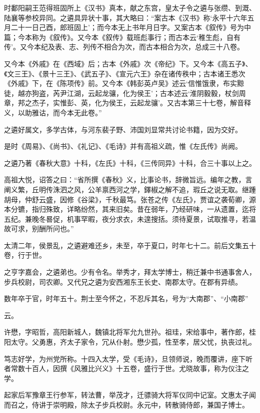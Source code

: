 \documentclass[12pt,UTF8]{ctexbook}
\begin{document}
时鄱阳嗣王范得班固所上《汉书》真本，献之东宫，皇太子令之遴与张缵、到溉、陆襄等参校异同。之遴具异状十事，其大略曰：“案古本《汉书》称‘永平十六年五月二十一日己酉，郎班固上’；而今本无上书年月日字。又案古本《叙传》号为中篇；今本称为《叙传》。又今本《叙传》载班彪事行；而古本云‘稚生彪，自有传’。又今本纪及表、志、列传不相合为次，而古本相合为次，总成三十八卷。

又今本《外戚》在《西域》后；古本《外戚》次《帝纪》下。又今本《高五子》、《文三王》、《景十三王》、《武五子》、《宣元六王》杂在诸传秩中；古本诸王悉次《外戚》下，在《陈项传》前。又今本《韩彭英卢吴》述云‘信惟饿隶，布实黥徒，越亦狗盗，芮尹江湖，云起龙骧，化为侯王’；古本述云‘淮阴毅毅，杖剑周章，邦之杰子，实惟彭、英，化为侯王，云起龙骧’。又古本第三十七卷，解音释义，以助雅诂，而今本无此卷。”

之遴好属文，多学古体，与河东裴子野、沛国刘显常共讨论书籍，因为交好。

是时《周易》、《尚书》、《礼记》、《毛诗》并有高祖义疏，惟《左氏传》尚阙。

之遴乃著《春秋大意》十科，《左氏》十科，《三传同异》十科，合三十事以上之。

高祖大悦，诏答之曰：“省所撰《春秋》义，比事论书，辞微旨远。编年之教，言阐义繁，丘明传洙泗之风，公羊禀西河之学，鐸椒之解不追，瑕丘之说无取。继踵胡母，仲舒云盛，因修《谷梁》，千秋最笃。张苍之传《左氏》，贾谊之袭荀卿，源本分镳，指归殊致，详略纷然，其来旧矣。昔在弱年，乃经研味，一从遗置，迄将五纪。兼晚冬晷促，机事罕暇，夜分求衣，未遑搜括。须待夏景，试取推寻，若温故可求，别酬所问也。”

太清二年，侯景乱，之遴避难还乡，未至，卒于夏口，时年七十二。前后文集五十卷，行于世。

之亨字嘉会，之遴弟也。少有令名。举秀才，拜太学博士，稍迁兼中书通事舍人，步兵校尉，司农卿。又代兄之遴为安西湘东王长史、南郡太守。在郡有异绩。

数年卒于官，时年五十。荆士至今怀之，不忍斥其名，号为“大南郡”、“小南郡”

云。

许懋，字昭哲，高阳新城人，魏镇北将军允九世孙。祖珪，宋给事中，著作郎，桂阳太守。父勇惠，齐太子家令，冗从仆射。懋少孤，性至孝，居父忧，执丧过礼。

笃志好学，为州党所称。十四入太学，受《毛诗》，旦领师说，晚而覆讲，座下听者常数十百人，因撰《风雅比兴义》十五卷，盛行于世。尤晓故事，称为仪注之学。

起家后军豫章王行参军，转法曹，举茂才，迁骠骑大将军仪同中记室。文惠太子闻而召之，侍讲于崇明殿，除太子步兵校尉。永元中，转散骑侍郎，兼国子博士。
\end{document}
